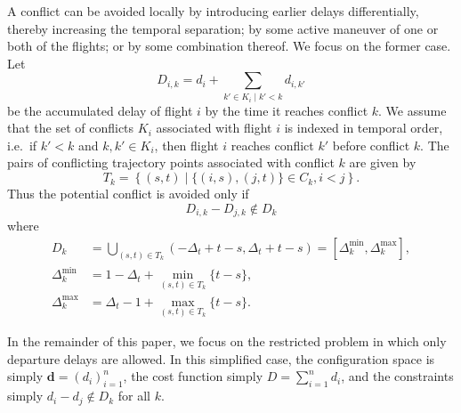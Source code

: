 A conflict can be avoided locally by introducing earlier delays differentially, thereby increasing the temporal separation; by some active maneuver of one or both of the flights; or by some combination thereof.
We focus on the former case.
Let 
\begin{equation}
D_{i, k} = d_i + \sum_{\left.k' \in K_i \middle| k' < k\right.} d_{i,k'}
\end{equation}
be the accumulated delay of flight $i$ by the time it reaches conflict $k$.
We assume that the set of conflicts $K_i$ associated with flight $i$ is indexed in temporal order, i.e.\ if $k' < k$ and $k, k' \in K_i$, then flight $i$ reaches conflict $k'$ before conflict $k$.
The pairs of conflicting trajectory points associated with conflict $k$ are given by 
\begin{equation}
T_k = 
\left\{
(s, t) \middle| \{(i, s), (j, t)\} \in C_k, i < j
\right\}.
\end{equation}
Thus the potential conflict is avoided only if 
\begin{equation}
D_{i, k} - D_{j, k}
\notin
D_k 
\end{equation}
where 
\begin{align}
D_k &= 
\bigcup_{(s, t) \in T_k}
\left(-\Delta_t + t - s, \Delta_t + t - s\right)
=
[\Delta^{\min}_k, \Delta^{\max}_k], \\
\Delta^{\min}_k &= 1 - \Delta_t + \min_{(s, t) \in T_k} \{t - s\},\\
\Delta^{\max}_k &= \Delta_t - 1 + \max_{(s, t) \in T_k} \{t - s\}.
\end{align}


In the remainder of this paper, we focus on the restricted problem in which only departure delays are allowed.
In this simplified case, the configuration space is simply 
$\mathbf d = {\left(d_i\right)}_{i=1}^n$, the cost function simply $D = \sum_{i = 1}^n d_i$, and the constraints simply $d_i - d_j \notin D_k$ for all $k$.
